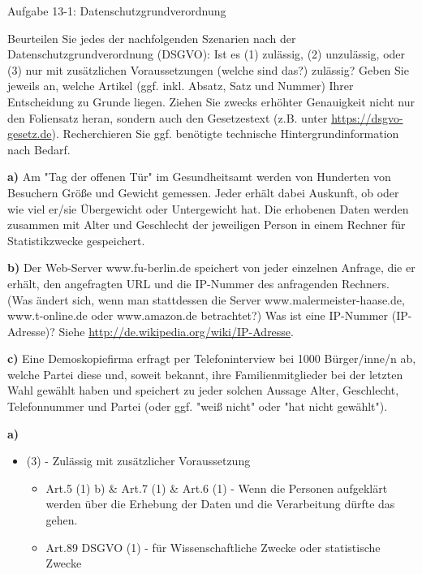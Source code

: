 \documentclass[a4paper]{assignment}
\date{26 Januar 2025}
\begin{document}
	\begin{problemlist}
		\pbitem Aufgabe 13-1: Datenschutzgrundverordnung
		\begin{problem}

Beurteilen Sie jedes der nachfolgenden Szenarien nach der Datenschutzgrundverordnung (DSGVO): Ist es (1) zulässig, (2) unzulässig, oder (3) nur mit zusätzlichen Voraussetzungen (welche sind das?) zulässig? 
Geben Sie jeweils an, welche Artikel (ggf. inkl. Absatz, Satz und Nummer) Ihrer Entscheidung zu Grunde liegen. Ziehen Sie zwecks erhöhter Genauigkeit nicht nur den Foliensatz heran, sondern auch den Gesetzestext (z.B. unter \url{https://dsgvo-gesetz.de}). Recherchieren Sie ggf. benötigte technische Hintergrundinformation nach Bedarf.		

\textbf{a)} Am "Tag der offenen Tür" im Gesundheitsamt werden von Hunderten von Besuchern Größe und Gewicht gemessen. Jeder erhält dabei Auskunft, ob oder wie viel er/sie Übergewicht oder Untergewicht hat. Die erhobenen Daten werden zusammen mit Alter und Geschlecht der jeweiligen Person in einem Rechner für Statistikzwecke gespeichert.

\textbf{b)} Der Web-Server www.fu-berlin.de speichert von jeder einzelnen Anfrage, die er erhält, den angefragten URL und die IP-Nummer des anfragenden Rechners. (Was ändert sich, wenn man stattdessen die Server www.malermeister-haase.de, www.t-online.de oder www.amazon.de betrachtet?) Was ist eine IP-Nummer (IP-Adresse)? Siehe \url{http://de.wikipedia.org/wiki/IP-Adresse}.

\textbf{c)} Eine Demoskopiefirma erfragt per Telefoninterview bei 1000 Bürger/inne/n ab, welche Partei diese und, soweit bekannt, ihre Familienmitglieder bei der letzten Wahl gewählt haben und speichert zu jeder solchen Aussage Alter, Geschlecht, Telefonnummer und Partei (oder ggf. "weiß nicht" oder "hat nicht gewählt").


			\begin{answer}
				\textbf{a)}
				\begin{itemize}
					\item (3) - Zulässig mit zusätzlicher Voraussetzung
						\begin{itemize}
						\item Art.5 (1) b)\cite{dsgvo5} \& Art.7 (1)\cite{dsgvo7} \& Art.6 (1)\cite{dsgvo6} - Wenn die Personen aufgeklärt werden über die Erhebung der Daten und die Verarbeitung dürfte das gehen.
						\item Art.89 DSGVO (1)\cite{dsgvo89} - für Wissenschaftliche Zwecke oder statistische Zwecke
						\end{itemize}
				\end{itemize}
				

\end{answer}
\end{problem}
\end{problemlist}
\end{document}
